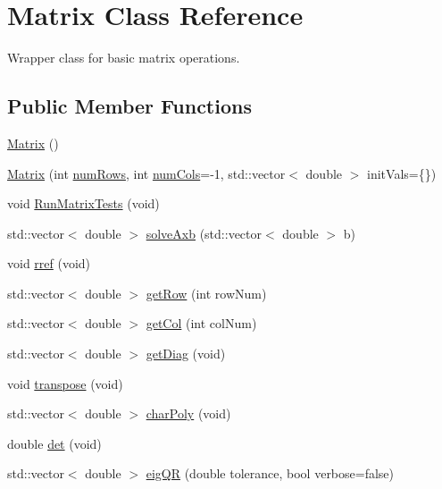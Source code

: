 \hypertarget{class_matrix}{}\section{Matrix Class Reference}
\label{class_matrix}


Wrapper class for basic matrix operations.  


\subsection*{Public Member Functions}
\begin{DoxyCompactItemize}
\item 
\mbox{\hyperlink{class_matrix_a2dba13c45127354c9f75ef576f49269b}{Matrix}} ()
\item 
\mbox{\hyperlink{class_matrix_a4b4b9ae88079c441a7acc781fdbaa032}{Matrix}} (int \mbox{\hyperlink{class_matrix_a0eb658c64c749da9cc9705dc232fcb85}{num\+Rows}}, int \mbox{\hyperlink{class_matrix_a1ddb385f8482c80f98e5cdbf914ba11a}{num\+Cols}}=-\/1, std\+::vector$<$ double $>$ init\+Vals=\{\})
\item 
void \mbox{\hyperlink{class_matrix_a90d3e687ed2b75462f74b737d891f7ca}{Run\+Matrix\+Tests}} (void)
\item 
std\+::vector$<$ double $>$ \mbox{\hyperlink{class_matrix_ae340b61a6f3848f700ba34cd3992d2ab}{solve\+Axb}} (std\+::vector$<$ double $>$ b)
\item 
void \mbox{\hyperlink{class_matrix_a5510abd211511ab980d69b160d742f78}{rref}} (void)
\item 
std\+::vector$<$ double $>$ \mbox{\hyperlink{class_matrix_a81f93e482ceaca5d013ab34b64ee3eb4}{get\+Row}} (int row\+Num)
\item 
std\+::vector$<$ double $>$ \mbox{\hyperlink{class_matrix_a01b08c4fed1a9f7e80467e613cfc8c9e}{get\+Col}} (int col\+Num)
\item 
std\+::vector$<$ double $>$ \mbox{\hyperlink{class_matrix_adc0504b22f3d95218b5e754890f0db3e}{get\+Diag}} (void)
\item 
void \mbox{\hyperlink{class_matrix_ac9afd875262d35e1bab18604e3bc121c}{transpose}} (void)
\item 
std\+::vector$<$ double $>$ \mbox{\hyperlink{class_matrix_ac702d7055ec8bd0d804af3025b51cdec}{char\+Poly}} (void)
\item 
double \mbox{\hyperlink{class_matrix_a8229fbecb4ec1119be6c210186ecb95c}{det}} (void)
\item 
std\+::vector$<$ double $>$ \mbox{\hyperlink{class_matrix_adcb3d7e342e79b4d667860ffbf9811a1}{eig\+QR}} (double tolerance, bool verbose=false)

\end{DoxyCompactItemize}
